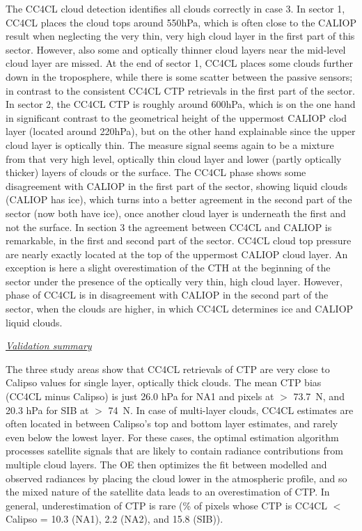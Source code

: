 {The CC4CL cloud detection identifies all clouds correctly in case 3. In sector 1, CC4CL places the cloud tops around 550hPa, which is often close to the CALIOP result when neglecting the very thin, very high cloud layer in the first part of this sector. However, also some and optically thinner cloud layers near the mid-level cloud layer are missed. At the end of sector 1, CC4CL places some clouds further down in the troposphere, while there is some scatter between the passive sensors; in contrast to the consistent CC4CL CTP retrievals in the first part of the sector. In sector 2, the CC4CL CTP is roughly around 600hPa, which is on the one hand in significant contrast to the geometrical height of the uppermost CALIOP clod layer (located around 220hPa), but on the other hand explainable since the upper cloud layer is optically thin. The measure signal seems again to be a mixture from that very high level, optically thin cloud layer and lower (partly optically thicker) layers of clouds or the surface. The CC4CL phase shows some disagreement with CALIOP in the first part of the sector, showing liquid clouds (CALIOP has ice), which turns into a better agreement in the second part of the sector (now both have ice), once another cloud layer is underneath the first and not the surface. In section 3 the agreement between CC4CL and CALIOP is remarkable, in the first and second part of the sector. CC4CL cloud top pressure are nearly exactly located at the top of the uppermost CALIOP cloud layer. An exception is here a slight overestimation of the CTH at the beginning of the sector under the presence of the optically very thin, high cloud layer. However, phase of CC4CL is in disagreement with CALIOP in the second part of the sector, when the clouds are higher, in which CC4CL determines ice and CALIOP liquid clouds.

\vspace{5mm}\underline{\textit{Validation summary}}\vspace{2mm}

}


The three study areas show that CC4CL retrievals of CTP are very close to Calipso values for single layer, optically thick clouds. The mean CTP bias (CC4CL minus Calipso) is just 26.0 hPa for NA1 and pixels at $>$ 73.7\textdegree\ N, and 20.3 hPa for SIB at $>$ 74\textdegree\ N. In case of multi-layer clouds, CC4CL estimates are often located in between Calipso's top and bottom layer estimates, and rarely even below the lowest layer. For these cases, the optimal estimation algorithm processes satellite signals that are likely to contain radiance contributions from multiple cloud layers. The OE then optimizes the fit between modelled and observed radiances by placing the cloud lower in the atmospheric profile, and so the mixed nature of the satellite data leads to an overestimation of CTP. In general, underestimation of CTP is rare (\% of pixels whose CTP is CC4CL $<$ Calipso = 10.3 (NA1), 2.2 (NA2), and 15.8 (SIB)).

